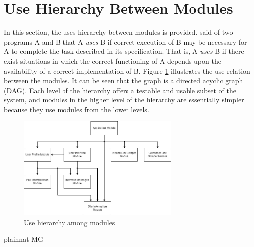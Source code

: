 \documentclass[12pt, titlepage]{article}
\begin{document}
\section{Use Hierarchy Between Modules} \label{SecUse}

In this section, the uses hierarchy between modules is
provided. \citet{Parnas1978} said of two programs A and B that A {\em uses} B if
correct execution of B may be necessary for A to complete the task described in
its specification. That is, A {\em uses} B if there exist situations in which
the correct functioning of A depends upon the availability of a correct
implementation of B.  Figure \ref{FigUH} illustrates the use relation between
the modules. It can be seen that the graph is a directed acyclic graph
(DAG). Each level of the hierarchy offers a testable and usable subset of the
system, and modules in the higher level of the hierarchy are essentially simpler
because they use modules from the lower levels.

\begin{figure}[H]
\centering
\includegraphics[width=0.7\textwidth]{UsesHierarchy.jpg} 
\caption{Use hierarchy among modules}
\label{FigUH}
\end{figure}

 {plainnat}
 {MG}
\end{document}
